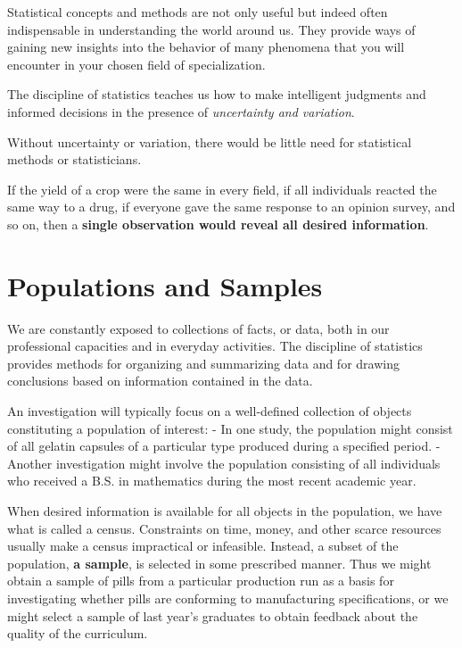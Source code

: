 \documentclass[]{book}
\theoremstyle{definition}
\theoremstyle{definition}
\theoremstyle{definition}
\theoremstyle{remark}
\let\BeginKnitrBlock\begin \let\EndKnitrBlock\end
\begin{document}
Statistical concepts and methods are not only useful but indeed often
indispensable in understanding the world around us. They provide ways of
gaining new insights into the behavior of many phenomena that you will
encounter in your chosen field of specialization.

The discipline of statistics teaches us how to make intelligent
judgments and informed decisions in the presence of \emph{uncertainty
and variation}.

\BeginKnitrBlock{rmdimportant}
Without uncertainty or variation, there would be little need for
statistical methods or statisticians.
\EndKnitrBlock{rmdimportant}

If the yield of a crop were the same in every field, if all individuals
reacted the same way to a drug, if everyone gave the same response to an
opinion survey, and so on, then a \textbf{single observation would
reveal all desired information}.

\section{Populations and Samples}\label{populations-and-samples}

We are constantly exposed to collections of facts, or data, both in our
professional capacities and in everyday activities. The discipline of
statistics provides methods for organizing and summarizing data and for
drawing conclusions based on information contained in the data.

An investigation will typically focus on a well-defined collection of
objects constituting a population of interest: - In one study, the
population might consist of all gelatin capsules of a particular type
produced during a specified period. - Another investigation might
involve the population consisting of all individuals who received a B.S.
in mathematics during the most recent academic year.

When desired information is available for all objects in the population,
we have what is called a census. Constraints on time, money, and other
scarce resources usually make a census impractical or infeasible.
Instead, a subset of the population, \textbf{a sample}, is selected in
some prescribed manner. Thus we might obtain a sample of pills from a
particular production run as a basis for investigating whether pills are
conforming to manufacturing specifications, or we might select a sample
of last year's graduates to obtain feedback about the quality of the
curriculum.
\end{document}
